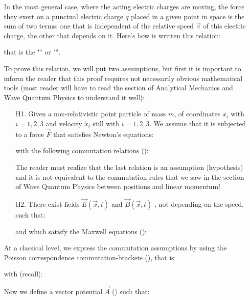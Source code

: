 	In the most general case, where the acting electric charges are moving, the force they exert on a punctual electric charge $q$ placed in a given point in space is the sum of two terms: one that is independent of the relative speed $\vec{v}$ of this electric charge, the other that depends on it. Here's how is written this relation:
	
	that is the "" or "".
	
	To prove this relation, we will put two assumptions, but first it is important to inform the reader that this proof requires not necessarily obvious mathematical tools (most reader will have to read the section of Analytical Mechanics and Wave Quantum Physics to understand it well):
	\begin{enumerate}
		\item[H1.] Given a non-relativistic point particle of mass $m$, of coordinates $x_i$ with $i=1,2,3$ and velocity $\dot{x}_i$ still with $i=1,2,3$. We assume that it is subjected to a force $\vec{F}$ that satisfies Newton's equations:
		
		with the following commutation relations ():
		
	 	The reader must realize that the last relation is an assumption (hypothesis) and it is not equivalent to the commutation rules that we saw in the section of Wave Quantum Physics between positions and linear momentum!

		\item[H2.] There exist fields $\vec{E}(\vec{x},t)$ and $\vec{B}(\vec{x},t)$ , not depending on the speed, such that:
		
		and which satisfy the Maxwell equations ():
		
	\end{enumerate}
	At a classical level, we express the commutation assumptions by using the Poisson correspondence commutation-brackets (), that is:
	
	with (recall):
	
	Now we define a vector potential $\vec{A}$ () such that:
	
